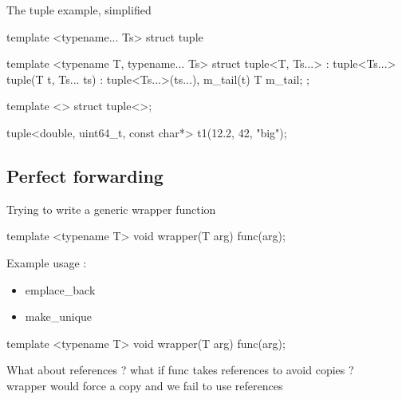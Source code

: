 \begin{frame}[fragile]
  \begin{block}{The tuple example, simplified}
    \begin{cppcode*}{}
      template <typename... Ts> struct tuple {}

      template <typename T, typename... Ts>
      struct tuple<T, Ts...> : tuple<Ts...> {
        tuple(T t, Ts... ts) :
          tuple<Ts...>(ts...), m_tail(t) {}
        T m_tail;
      };

      template <> struct tuple<>{};

      tuple<double, uint64_t, const char*>
        t1(12.2, 42, "big");
    \end{cppcode*}
  \end{block}
\end{frame}

\subsection[forward]{Perfect forwarding}

\begin{frame}[fragile]
  Trying to write a generic wrapper function
  \begin{cppcode*}{}
    template <typename T>
    void wrapper(T arg) {
      func(arg);
    }
  \end{cppcode*}
  Example usage :
  \begin{itemize}
  \item emplace\_back
  \item make\_unique
  \end{itemize}
\end{frame}

\begin{frame}[fragile]
  \begin{cppcode*}{}
    template <typename T>
    void wrapper(T arg) {
      func(arg);
    }
  \end{cppcode*}
  \begin{alertblock}{What about references ?}
    what if func takes references to avoid copies ?\\
    wrapper would force a copy and we fail to use references
  \end{alertblock}
\end{frame}

